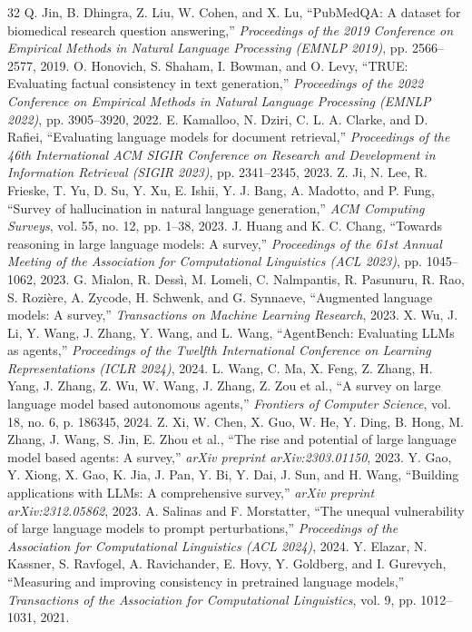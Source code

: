 \documentclass[10pt, conference, letterpaper]{IEEEtran}
\begin{document}
\begin{thebibliography}{32}
 Q. Jin, B. Dhingra, Z. Liu, W. Cohen, and X. Lu, ``PubMedQA: A dataset for biomedical research question answering,'' \textit{Proceedings of the 2019 Conference on Empirical Methods in Natural Language Processing (EMNLP 2019)}, pp. 2566--2577, 2019.
 O. Honovich, S. Shaham, I. Bowman, and O. Levy, ``TRUE: Evaluating factual consistency in text generation,'' \textit{Proceedings of the 2022 Conference on Empirical Methods in Natural Language Processing (EMNLP 2022)}, pp. 3905--3920, 2022.
 E. Kamalloo, N. Dziri, C. L. A. Clarke, and D. Rafiei, ``Evaluating language models for document retrieval,'' \textit{Proceedings of the 46th International ACM SIGIR Conference on Research and Development in Information Retrieval (SIGIR 2023)}, pp. 2341--2345, 2023.
 Z. Ji, N. Lee, R. Frieske, T. Yu, D. Su, Y. Xu, E. Ishii, Y. J. Bang, A. Madotto, and P. Fung, ``Survey of hallucination in natural language generation,'' \textit{ACM Computing Surveys}, vol. 55, no. 12, pp. 1--38, 2023.
 J. Huang and K. C. Chang, ``Towards reasoning in large language models: A survey,'' \textit{Proceedings of the 61st Annual Meeting of the Association for Computational Linguistics (ACL 2023)}, pp. 1045--1062, 2023.
 G. Mialon, R. Dess{\`i}, M. Lomeli, C. Nalmpantis, R. Pasunuru, R. Rao, S. Rozi{\`e}re, A. Zycode, H. Schwenk, and G. Synnaeve, ``Augmented language models: A survey,'' \textit{Transactions on Machine Learning Research}, 2023.
 X. Wu, J. Li, Y. Wang, J. Zhang, Y. Wang, and L. Wang, ``AgentBench: Evaluating LLMs as agents,'' \textit{Proceedings of the Twelfth International Conference on Learning Representations (ICLR 2024)}, 2024.
 L. Wang, C. Ma, X. Feng, Z. Zhang, H. Yang, J. Zhang, Z. Wu, W. Wang, J. Zhang, Z. Zou et al., ``A survey on large language model based autonomous agents,'' \textit{Frontiers of Computer Science}, vol. 18, no. 6, p. 186345, 2024.
 Z. Xi, W. Chen, X. Guo, W. He, Y. Ding, B. Hong, M. Zhang, J. Wang, S. Jin, E. Zhou et al., ``The rise and potential of large language model based agents: A survey,'' \textit{arXiv preprint arXiv:2303.01150}, 2023.
 Y. Gao, Y. Xiong, X. Gao, K. Jia, J. Pan, Y. Bi, Y. Dai, J. Sun, and H. Wang, ``Building applications with LLMs: A comprehensive survey,'' \textit{arXiv preprint arXiv:2312.05862}, 2023.
 A. Salinas and F. Morstatter, ``The unequal vulnerability of large language models to prompt perturbations,'' \textit{Proceedings of the Association for Computational Linguistics (ACL 2024)}, 2024.
 Y. Elazar, N. Kassner, S. Ravfogel, A. Ravichander, E. Hovy, Y. Goldberg, and I. Gurevych, ``Measuring and improving consistency in pretrained language models,'' \textit{Transactions of the Association for Computational Linguistics}, vol. 9, pp. 1012--1031, 2021.
\end{thebibliography}
\end{document}
